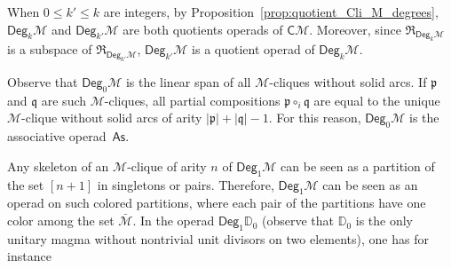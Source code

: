 \documentclass[10pt,reqno]{amsart}
\numberwithin{equation}{subsection}
\renewcommand{\leq}{\leqslant}
\newcommand{\Mca}{\mathcal{M}}
\newcommand{\Dbb}{\mathbb{D}}
\newcommand{\Pfr}{\mathfrak{p}}
\newcommand{\Qfr}{\mathfrak{q}}
\newcommand{\As}{\mathsf{As}}
\newcommand{\Cli}{\mathsf{C}}
\newcommand{\Deg}{\mathsf{Deg}}
\newcommand{\Rel}{\mathfrak{R}}
\begin{document}
When $0 \leq k' \leq k$ are integers, by
Proposition~\ref{prop:quotient_Cli_M_degrees}, $\Deg_k\Mca$ and
$\Deg_{k'}\Mca$ are both quotients operads of $\Cli\Mca$. Moreover,
since $\Rel_{\Deg_k\Mca}$ is a subspace of $\Rel_{\Deg_{k'}\Mca}$,
$\Deg_{k'}\Mca$ is a quotient operad of $\Deg_k\Mca$.
\medskip

Observe that $\Deg_0\Mca$ is the linear span of all $\Mca$-cliques
without solid arcs. If $\Pfr$ and $\Qfr$ are such $\Mca$-cliques, all
partial compositions $\Pfr \circ_i \Qfr$ are equal to the unique
$\Mca$-clique without solid arcs of arity $|\Pfr| + |\Qfr| - 1$. For
this reason, $\Deg_0\Mca$ is the associative operad~$\As$.
\medskip

Any skeleton of an $\Mca$-clique of arity $n$ of $\Deg_1\Mca$ can be
seen as a partition of the set $[n + 1]$ in singletons or pairs.
Therefore, $\Deg_1\Mca$ can be seen as an operad on such colored
partitions, where each pair of the partitions have one color among the
set $\bar{\Mca}$. In the operad $\Deg_1\Dbb_0$ (observe that $\Dbb_0$ is
the only unitary magma without nontrivial unit divisors on two
elements), one has for instance
\vspace{-1.75em}
\end{document}
